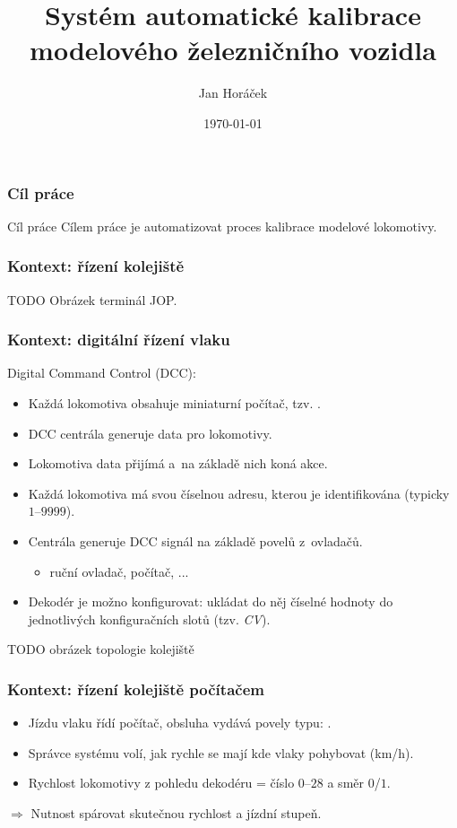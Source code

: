 \documentclass[aspectratio=169]{beamer}
\title[Automatická kalibrace]{Systém automatické kalibrace modelového
železničního vozidla}
\author{Jan Horáček}
\institute[FI MUNI]{
	Fakulta informatiky \\
	Masarykova univerzita \\
	\medskip
	\textit{horacekj@mail.muni.cz}
}
\date{\today}
\begin{document}

\begin{frame}
\titlepage
\end{frame}


\begin{frame}
\frametitle{Cíl práce}
\begin{block}{Cíl práce}
Cílem práce je automatizovat proces kalibrace modelové lokomotivy.
\end{block}
\end{frame}


\begin{frame}
\frametitle{Kontext: řízení kolejiště}
TODO Obrázek terminál JOP.
\end{frame}


\begin{frame}
\frametitle{Kontext: digitální řízení vlaku}
Digital Command Control (DCC):
\begin{itemize}
\item Každá lokomotiva obsahuje miniaturní počítač, tzv. .
\item DCC centrála generuje data pro lokomotivy.
\item Lokomotiva data přijímá a na základě nich koná akce.
\item Každá lokomotiva má svou číselnou adresu, kterou je identifikována (typicky
$1$--$9999$).
\item Centrála generuje DCC signál na základě povelů z~ovladačů.
\begin{itemize}
\item ruční ovladač, počítač, ...
\end{itemize}
\item Dekodér je možno konfigurovat: ukládat do něj číselné hodnoty do jednotlivých
konfiguračních slotů (tzv. \textit{CV}).
\end{itemize}

TODO obrázek topologie kolejiště
\end{frame}


\begin{frame}
\frametitle{Kontext: řízení kolejiště počítačem}
\begin{itemize}
\item Jízdu vlaku řídí počítač, obsluha vydává povely typu: .
\item Správce systému volí, jak rychle se mají kde vlaky pohybovat (km/h).
\item Rychlost lokomotivy z pohledu dekodéru = číslo $0$--$28$ a směr $0$/$1$.
\end{itemize}
$\Rightarrow$ Nutnost spárovat skutečnou rychlost a jízdní stupeň.
\end{frame}
\end{document}
